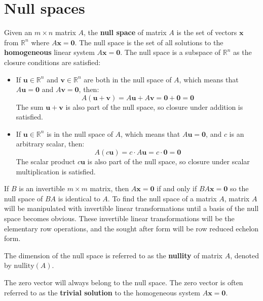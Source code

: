 \documentclass{article}
\begin{document}
\section*{Null spaces}

Given an \(m \times n\) matrix \(A\), the {\bf null space} of matrix \(A\) is the set of vectors \(\mathbf{x}\) from \(\mathbb{R}^n\) where \(A\mathbf{x} = \mathbf{0}\). The null space is the set of all solutions to the {\bf homogeneous} linear system \(A\mathbf{x} = \mathbf{0}\). The null space is a subspace of \(\mathbb{R}^n\) as the closure conditions are satisfied:

\begin{itemize}
\item If \(\mathbf{u} \in \mathbb{R}^n\) and \(\mathbf{v} \in \mathbb{R}^n\) are both in the null space of \(A\), which means that \(A\mathbf{u} = \mathbf{0}\) and \(A\mathbf{v} = \mathbf{0}\), then: 
\[A(\mathbf{u} + \mathbf{v}) = A\mathbf{u} + A\mathbf{v} = \mathbf{0} + \mathbf{0} = \mathbf{0}\]
The sum \(\mathbf{u} + \mathbf{v}\) is also part of the null space, so closure under addition is satisfied.
\item If \(\mathbf{u} \in \mathbb{R}^n\) is in the null space of \(A\), which means that \(A\mathbf{u} = \mathbf{0}\), and \(c\) is an arbitrary scalar, then: 
\[A(c\mathbf{u}) = c \cdot A\mathbf{u} = c \cdot \mathbf{0} = \mathbf{0}\]
The scalar product \(c\mathbf{u}\) is also part of the null space, so closure under scalar multiplication is satisfied.  
\end{itemize} 

If \(B\) is an invertible \(m \times m\) matrix, then \(A\mathbf{x} = \mathbf{0}\) if and only if \(BA\mathbf{x} = \mathbf{0}\) so the null space of \(BA\) is identical to \(A\). To find the null space of a matrix \(A\), matrix \(A\) will be manipulated with invertible linear transformations until a basis of the null space becomes obvious. These invertible linear transformations will be the elementary row operations, and the sought after form will be row reduced echelon form.  

\vspace{5mm}

The dimension of the null space is referred to as the {\bf nullity} of matrix \(A\), denoted by \(\text{nullity}(A)\).

\vspace{5mm} 

The zero vector will always belong to the null space. The zero vector is often referred to as the {\bf trivial solution} to the homogeneous system \(A\mathbf{x} = \mathbf{0}\).
\end{document}
